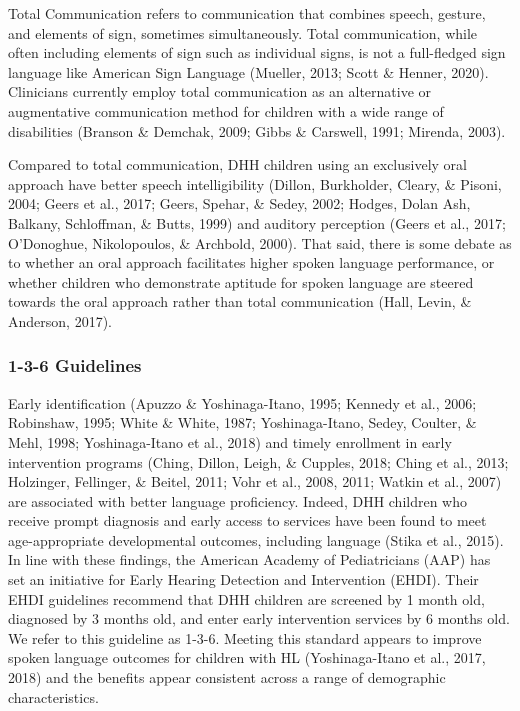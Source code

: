 \documentclass[
  english,
  man]{apa6}
\begin{document}
Total Communication refers to communication that combines speech, gesture, and elements of sign, sometimes simultaneously. Total communication, while often including elements of sign such as individual signs, is not a full-fledged sign language like American Sign Language (Mueller, 2013; Scott \& Henner, 2020). Clinicians currently employ total communication as an alternative or augmentative communication method for children with a wide range of disabilities (Branson \& Demchak, 2009; Gibbs \& Carswell, 1991; Mirenda, 2003).

Compared to total communication, DHH children using an exclusively oral approach have better speech intelligibility (Dillon, Burkholder, Cleary, \& Pisoni, 2004; Geers et al., 2017; Geers, Spehar, \& Sedey, 2002; Hodges, Dolan Ash, Balkany, Schloffman, \& Butts, 1999) and auditory perception (Geers et al., 2017; O'Donoghue, Nikolopoulos, \& Archbold, 2000). That said, there is some debate as to whether an oral approach facilitates higher spoken language performance, or whether children who demonstrate aptitude for spoken language are steered towards the oral approach rather than total communication (Hall, Levin, \& Anderson, 2017).

\hypertarget{guidelines}{%
\subsubsection{1-3-6 Guidelines}\label{guidelines}}

Early identification (Apuzzo \& Yoshinaga-Itano, 1995; Kennedy et al., 2006; Robinshaw, 1995; White \& White, 1987; Yoshinaga-Itano, Sedey, Coulter, \& Mehl, 1998; Yoshinaga-Itano et al., 2018) and timely enrollment in early intervention programs (Ching, Dillon, Leigh, \& Cupples, 2018; Ching et al., 2013; Holzinger, Fellinger, \& Beitel, 2011; Vohr et al., 2008, 2011; Watkin et al., 2007) are associated with better language proficiency. Indeed, DHH children who receive prompt diagnosis and early access to services have been found to meet age-appropriate developmental outcomes, including language (Stika et al., 2015).
In line with these findings, the American Academy of Pediatricians (AAP) has set an initiative for Early Hearing Detection and Intervention (EHDI). Their EHDI guidelines recommend that DHH children are screened by 1 month old, diagnosed by 3 months old, and enter early intervention services by 6 months old. We refer to this guideline as 1-3-6. Meeting this standard appears to improve spoken language outcomes for children with HL (Yoshinaga-Itano et al., 2017, 2018) and the benefits appear consistent across a range of demographic characteristics.
\end{document}
